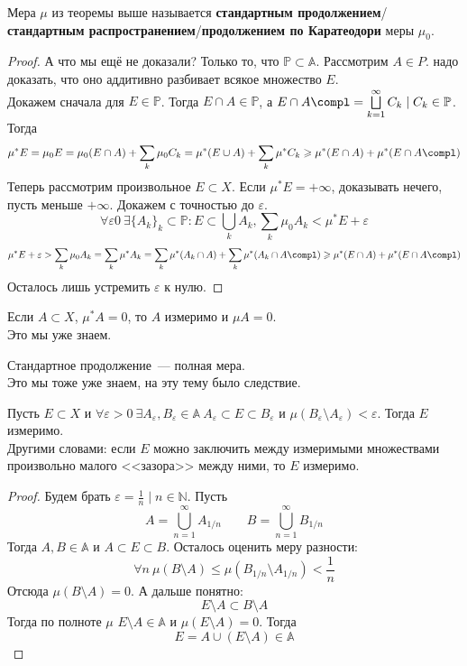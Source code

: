 \documentclass{article}
\let\eps\varepsilon
\begin{document}
    \begin{definition}
         Мера $\mu$ из теоремы выше называется \textbf{стандартным продолжением}/\textbf{стандартным распространением}/\textbf{продолжением по Каратеодори} меры $\mu_0$.
    \end{definition}
    \begin{proof}
        А что мы ещё не доказали? Только то, что $\mathbb P\subset\mathbb A$. Рассмотрим $A\in P$. надо доказать, что оно аддитивно разбивает всякое множество $E$.\\
        Докажем сначала для $E\in\mathbb P$. Тогда $E\cap A\in\mathbb P$, а $E\cap A\compl=\bigsqcup\limits_{k=1}^\infty C_k\mid C_k\in\mathbb P$. Тогда
        $$
        \mu^*E=\mu_0E=\mu_0(E\cap A)+\sum\limits_k\mu_0C_k=\mu^*(E\cup A)+\sum\limits_k\mu^*C_k\geqslant\mu^*(E\cap A)+\mu^*(E\cap A\compl)
        $$
        Теперь рассмотрим произвольное $E\subset X$. Если $\mu^*E=+\infty$, доказывать нечего, пусть меньше $+\infty$. Докажем с точностью до $\eps$.
        $$
        \forall\eps0~\exists\{A_k\}_k\subset\mathbb P: E\subset\bigcup\limits_kA_k,\sum\limits_k\mu_0A_k<\mu^*E+\eps
        $$
        $$
        \mu^*E+\eps>\sum\limits_k\mu_0A_k=\sum\limits_k\mu^*A_k=\sum\limits_k\mu^*(A_k\cap A)+\sum\limits_k\mu^*(A_k\cap A\compl)\geqslant\mu^*(E\cap A)+\mu^*(E\cap A\compl)
        $$
        Осталось лишь устремить $\eps$ к нулю.
    \end{proof}
    \begin{property}
        Если $A\subset X$, $\mu^*A=0$, то $A$ измеримо и $\mu A=0$.\\
        Это мы уже знаем.
    \end{property}
    \begin{property}
        Стандартное продолжение~--- полная мера.\\
        Это мы тоже уже знаем, на эту тему было следствие.
    \end{property}
    \begin{property}
        \label{Критерий измеримости}
        Пусть $E\subset X$ и $\forall\eps>0~\exists A_\eps,B_\eps\in\mathbb A~A_\eps\subset E\subset B_\eps$ и $\mu(B_\eps\setminus A_\eps)<\eps$. Тогда $E$ измеримо.\\
        Другими словами: если $E$ можно заключить между измеримыми множествами произвольно малого <<зазора>> между ними, то $E$ измеримо.
    \end{property}
    \begin{proof}
        Будем брать $\eps=\frac1n\mid n\in\mathbb N$. Пусть
        $$
        A=\bigcup\limits_{n=1}^\infty A_{1/n}\qquad B=\bigcup\limits_{n=1}^\infty B_{1/n}
        $$
        Тогда $A,B\in\mathbb A$ и $A\subset E\subset B$. Осталось оценить меру разности:
        $$
        \forall n~\mu(B\setminus A)\leqslant\mu(B_{1/n}\setminus A_{1/n})<\frac1n
        $$
        Отсюда $\mu(B\setminus A)=0$. А дальше понятно:
        $$
        E\setminus A\subset B\setminus A
        $$
        Тогда по полноте $\mu$ $E\setminus A\in\mathbb A$ и $\mu(E\setminus A)=0$. Тогда
        $$
        E=A\cup(E\setminus A)\in\mathbb A
        $$
    \end{proof}
\end{document}
